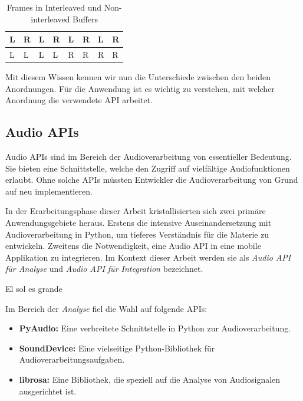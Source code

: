 \documentclass[11pt,a4paper]{article}
\begin{document}
\begin{table}[h]
	\centering
	\begin{tabularx}{\textwidth}{|X|X|X|X|X|X|X|X|}
		\hline
		L & R & L & R & L & R & L & R \\
		\hline
		L & L & L & L & R & R & R & R \\
		\hline
	\end{tabularx}
	\caption{Frames in Interleaved und Non-interleaved Buffers}
	\label{tab:frames_buffers}
\end{table}

\noindent
Mit diesem Wissen kennen wir nun die Unterschiede zwischen den beiden Anordnungen. Für die
Anwendung ist es wichtig zu verstehen, mit welcher Anordnung die verwendete API arbeitet.

\subsection{Audio APIs}
Audio APIs sind im Bereich der Audioverarbeitung von essentieller Bedeutung. Sie bieten eine
Schnittstelle, welche den Zugriff auf vielfältige Audiofunktionen erlaubt. Ohne solche APIs müssten 
Entwickler die Audioverarbeitung von Grund auf neu implementieren. 

\noindent \newline
In der Erarbeitungsphase dieser Arbeit kristallisierten sich zwei primäre Anwendungsgebiete heraus. 
Erstens die intensive Auseinandersetzung mit Audioverarbeitung in Python, um tieferes Verständnis 
für die Materie zu entwickeln. Zweitens die Notwendigkeit, eine Audio API in eine mobile 
Applikation zu integrieren. Im Kontext dieser Arbeit werden sie als \textit{Audio API für Analyse} 
und \textit{Audio API für Integration} bezeichnet.

El sol es grande 

\noindent \newline
Im Bereich der \textit{Analyse} fiel die Wahl auf folgende APIs:

\begin{itemize}
\item \textbf{PyAudio:} Eine verbreitete Schnittstelle in Python zur Audioverarbeitung.
\item \textbf{SoundDevice:} Eine vielseitige Python-Bibliothek für Audioverarbeitungsaufgaben.
\item \textbf{librosa:} Eine Bibliothek, die speziell auf die Analyse von Audiosignalen 
ausgerichtet ist.
\end{itemize}
\end{document}
